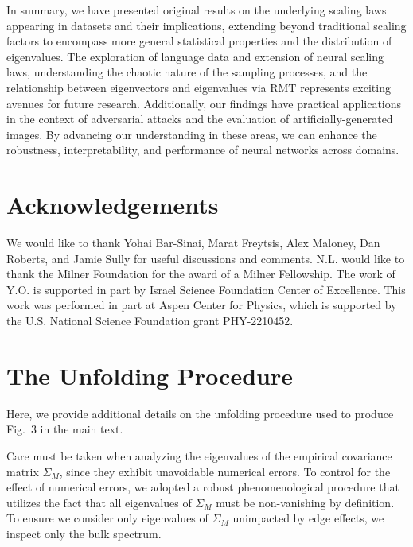 \documentclass{article}
\begin{document}
In summary, we have presented original results on the underlying scaling laws appearing in datasets and their implications, extending beyond traditional scaling factors to encompass more general statistical properties and the distribution of eigenvalues. The exploration of language data and extension of neural scaling laws, understanding the chaotic nature of the sampling processes, and the relationship between eigenvectors and eigenvalues via RMT represents exciting avenues for future research. Additionally, our findings have practical applications in the context of adversarial attacks and the evaluation of artificially-generated images. By advancing our understanding in these areas, we can enhance the robustness, interpretability, and performance of neural networks across domains.


\section{Acknowledgements}
\label{sec:Acknowledgements}

We would like to thank Yohai Bar-Sinai, Marat Freytsis, Alex Maloney, Dan Roberts, and Jamie Sully for useful discussions and comments. N.L. would
like to thank the Milner Foundation for the award of a Milner Fellowship.
The work of Y.O. is supported in part by Israel Science Foundation Center of Excellence.
This work was performed in part at Aspen Center for Physics, which is supported by the U.S. National Science Foundation grant PHY-2210452.













\newpage

\appendix

\section{The Unfolding Procedure}
\label{sec:unfolding}

Here, we provide additional details on the unfolding procedure used to produce Fig.~3 in the main text.


Care must be taken when analyzing the eigenvalues of the empirical covariance matrix $\Sigma_M$, since they exhibit unavoidable numerical errors. To control for the effect of numerical errors, we adopted a robust phenomenological procedure that utilizes the fact that all eigenvalues of $\Sigma_M$ must be non-vanishing by definition. To ensure we consider only eigenvalues of $\Sigma_M$ unimpacted by edge effects, we inspect only the bulk spectrum.
\end{document}
